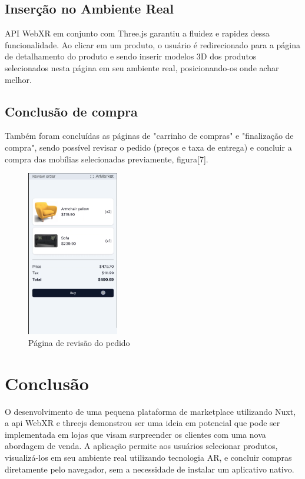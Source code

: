 \documentclass[conference]{IEEEtran}
\begin{document}
\subsection{Inserção no Ambiente Real}\label{AA}
API WebXR em conjunto com Three.js garantiu a fluidez e rapidez dessa
funcionalidade. Ao clicar em um produto, o usuário é redirecionado para a
página de detalhamento do produto e sendo inserir modelos 3D dos produtos
selecionados nesta página em seu ambiente real, posicionando-os onde achar
melhor.

\subsection{Conclusão de compra}\label{AA}
Também foram concluídas as páginas de "carrinho de compras" e "finalização de
compra", sendo possível revisar o pedido (preços e taxa de entrega) e concluir
a compra das mobílias selecionadas previamente, figura[7].

\begin{figure}[h]
  \caption{Página de revisão do pedido}

  \centering %
  \includegraphics[width=4cm]{assets/review_page.png}
\end{figure}

\section{Conclusão}
O desenvolvimento de uma pequena plataforma de marketplace utilizando Nuxt, a
api WebXR e threejs demonstrou ser uma ideia em potencial que pode ser
implementada em lojas que visam surpreender os clientes com uma nova abordagem
de venda. A aplicação permite aos usuários selecionar produtos, visualizá-los
em seu ambiente real utilizando tecnologia AR, e concluir compras diretamente
pelo navegador, sem a necessidade de instalar um aplicativo nativo.
\end{document}

